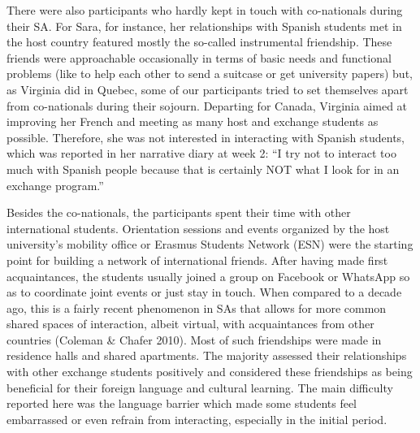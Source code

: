 \documentclass[12pt]{article}
\newenvironment{styleStandard}{\setlength\leftskip{0cm}\setlength\rightskip{0cm plus 1fil}\setlength\parindent{0cm}\setlength\parfillskip{0pt plus 1fil}\setlength\parskip{0in plus 1pt}\writerlistparindent\writerlistleftskip\leavevmode\normalfont\normalsize\writerlistlabel\ignorespaces}{\unskip\vspace{0.111in plus 0.0111in}\par}
\newcommand\writerlistleftskip{}
\newcommand\writerlistparindent{}
\newcommand\writerlistlabel{}
\begin{document}
\begin{styleStandard}
There were also participants who hardly kept in touch with co-nationals during their SA. For Sara, for instance, her relationships with Spanish students met in the host country featured mostly the so-called instrumental friendship. These friends were approachable occasionally in terms of basic needs and functional problems (like to help each other to send a suitcase or get university papers) but, as Virginia did in Quebec, some of our participants tried to set themselves apart from co-nationals during their sojourn. Departing for Canada, Virginia aimed at improving her French and meeting as many host and exchange students as possible. Therefore, she was not interested in interacting with Spanish students, which was reported in her narrative diary at week 2: “I try not to interact too much with Spanish people because that is certainly NOT what I look for in an exchange program.” 
\end{styleStandard}

\begin{styleStandard}
Besides the co-nationals, the participants spent their time with other international students. Orientation sessions and events organized by the host university’s mobility office or Erasmus Students Network (ESN) were the starting point for building a network of international friends. After having made first acquaintances, the students usually joined a group on Facebook or WhatsApp so as to coordinate joint events or just stay in touch. When compared to a decade ago, this is a fairly recent phenomenon in SAs that allows for more common shared spaces of interaction, albeit virtual, with acquaintances from other countries (Coleman \& Chafer 2010). Most of such friendships were made in residence halls and shared apartments. The majority assessed their relationships with other exchange students positively and considered these friendships as being beneficial for their foreign language and cultural learning. The main difficulty reported here was the language barrier which made some students feel embarrassed or even refrain from interacting, especially in the initial period. \ \ \ 
\end{styleStandard}
\end{document}
